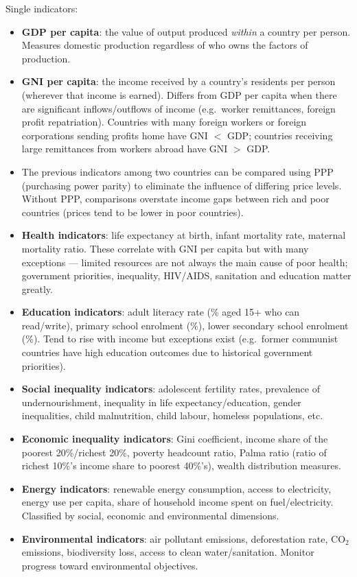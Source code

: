\documentclass[a4paper,12pt]{article}
\begin{document}
Single indicators:
\begin{itemize}
  \item \textbf{GDP per capita}: the value of output produced \textit{within} a country per person. Measures domestic production regardless of who owns the factors of production.
  \item \textbf{GNI per capita}: the income received by a country's residents per person (wherever that income is earned). Differs from GDP per capita when there are significant inflows/outflows of income (e.g.\ worker remittances, foreign profit repatriation). Countries with many foreign workers or foreign corporations sending profits home have GNI $<$ GDP; countries receiving large remittances from workers abroad have GNI $>$ GDP.
  \item The previous indicators among two countries can be compared using PPP (purchasing power parity) to eliminate the influence of differing price levels. Without PPP, comparisons overstate income gaps between rich and poor countries (prices tend to be lower in poor countries).
  \item \textbf{Health indicators}: life expectancy at birth, infant mortality rate, maternal mortality ratio. These correlate with GNI per capita but with many exceptions --- limited resources are not always the main cause of poor health; government priorities, inequality, HIV/AIDS, sanitation and education matter greatly.
  \item \textbf{Education indicators}: adult literacy rate (\% aged 15+ who can read/write), primary school enrolment (\%), lower secondary school enrolment (\%). Tend to rise with income but exceptions exist (e.g.\ former communist countries have high education outcomes due to historical government priorities).
  \item \textbf{Social inequality indicators}: adolescent fertility rates, prevalence of undernourishment, inequality in life expectancy/education, gender inequalities, child malnutrition, child labour, homeless populations, etc.
  \item \textbf{Economic inequality indicators}: Gini coefficient, income share of the poorest 20\%/richest 20\%, poverty headcount ratio, Palma ratio (ratio of richest 10\%'s income share to poorest 40\%'s), wealth distribution measures.
  \item \textbf{Energy indicators}: renewable energy consumption, access to electricity, energy use per capita, share of household income spent on fuel/electricity. Classified by social, economic and environmental dimensions.
  \item \textbf{Environmental indicators}: air pollutant emissions, deforestation rate, CO$_2$ emissions, biodiversity loss, access to clean water/sanitation. Monitor progress toward environmental objectives.
\end{itemize}
\end{document}

